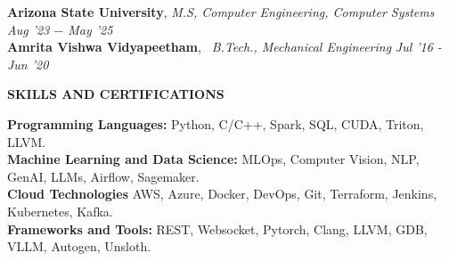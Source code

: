\documentclass[10pt,a4]{article}
\begin{document}
{\begin{flushleft}
    	\hspace{1.5mm} \textbf{\large Arizona State University}, \textit{M.S, Computer Engineering, Computer Systems}  \hfill \textit{Aug '23 $-$ May '25}	\\
        
        \hspace{1.5mm} \textbf{\large Amrita Vishwa Vidyapeetham}, \textit{\ B.Tech., Mechanical Engineering} \hfill \textit{ Jul '16 - Jun '20}	\\

\end{flushleft}

\begin{flushleft}
    {\Large \textbf {SKILLS AND CERTIFICATIONS}}
    
            \hspace{0.5cm}  \textbf{Programming Languages:} Python, C/C++, Spark, SQL, CUDA, Triton, LLVM. \\
            \hspace{0.5cm}  \textbf{Machine Learning and Data Science:} MLOps, Computer Vision, NLP, GenAI, LLMs, Airflow, Sagemaker. \\
            \hspace{0.5cm}  \textbf{Cloud Technologies} AWS, Azure, Docker, DevOps, Git, Terraform, Jenkins, Kubernetes, Kafka. \\
            \hspace{0.5cm}  \textbf{Frameworks and Tools:} REST, Websocket, Pytorch, Clang, LLVM, GDB, VLLM, Autogen, Unsloth. \\

        

\end{flushleft}
		
}
\end{document}
